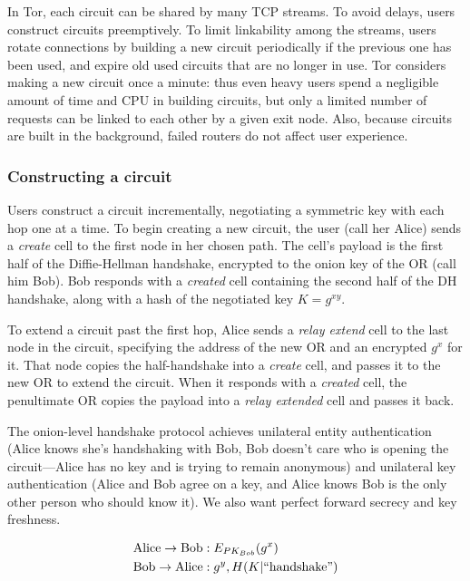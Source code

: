 \documentclass[times,10pt,twocolumn]{article}
\begin{document}
In Tor, each circuit can be shared by many TCP streams.  To avoid
delays, users construct circuits preemptively.  To limit linkability
among the streams, users rotate connections by building a new circuit
periodically if the previous one has been used,
and expire old used circuits that are no longer in use. Tor considers
making a new circuit once a minute: thus
even heavy users spend a negligible amount of time and CPU in
building circuits, but only a limited number of requests can be linked
to each other by a given exit node. Also, because circuits are built
in the background, failed routers do not affect user experience.

\subsubsection{Constructing a circuit}

Users construct a circuit incrementally, negotiating a symmetric key with
each hop one at a time. To begin creating a new circuit, the user
(call her Alice) sends a \emph{create} cell to the first node in her
chosen path. The cell's payload is the first half of the
Diffie-Hellman handshake, encrypted to the onion key of the OR (call
him Bob). Bob responds with a \emph{created} cell containing the second
half of the DH handshake, along with a hash of the negotiated key
$K=g^{xy}$.

To extend a circuit past the first hop, Alice sends a \emph{relay extend}
cell to the last node in the circuit, specifying the address of the new
OR and an encrypted $g^x$ for it. That node copies the half-handshake
into a \emph{create} cell, and passes it to the new OR to extend the
circuit. When it responds with a \emph{created} cell, the penultimate OR
copies the payload into a \emph{relay extended} cell and passes it back.

The onion-level handshake protocol achieves unilateral entity
authentication (Alice knows she's handshaking with Bob, Bob doesn't
care who is opening the circuit---Alice has no key and is trying to
remain anonymous) and unilateral key authentication (Alice and Bob
agree on a key, and Alice knows Bob is the only other person who should
know it). We also want perfect forward secrecy and key freshness.

\begin{equation}
\begin{aligned}
\mathrm{Alice} \rightarrow \mathrm{Bob}&: E_{PK_{Bob}}(g^x) \\
\mathrm{Bob} \rightarrow \mathrm{Alice}&: g^y, H(K | \mathrm{``handshake"}) \\
\end{aligned}
\end{equation}
\end{document}
